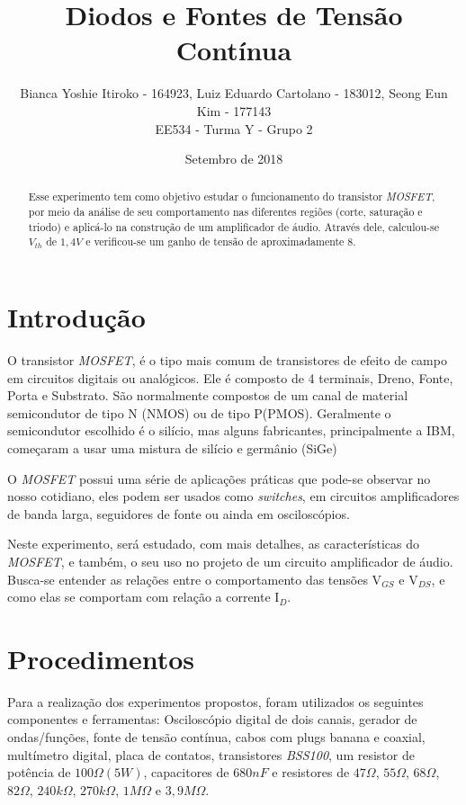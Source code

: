 \documentclass{article}
\begin{document}
\title{Diodos e Fontes de Tensão Contínua}
\author{Bianca Yoshie Itiroko - 164923, Luiz Eduardo Cartolano - 183012, Seong Eun Kim - 177143 \\ EE534 - Turma Y - Grupo 2}
\date{Setembro de 2018}

\maketitle

\begin{abstract}
Esse experimento tem como objetivo estudar o funcionamento do transistor \emph{MOSFET}, por meio da análise de seu comportamento nas diferentes regiões (corte, saturação e triodo) e aplicá-lo na construção de um amplificador de áudio. Através dele, calculou-se $V_{th}$ de $1,4V$ e verificou-se um ganho de tensão de aproximadamente $8$.
\end{abstract}

\section{Introdução}
O transistor \emph{MOSFET}, é o tipo mais comum de transistores de efeito de campo em circuitos digitais ou analógicos. Ele é composto de 4 terminais, Dreno, Fonte, Porta e Substrato. São normalmente compostos de um canal de material semicondutor de tipo N (NMOS) ou de tipo P(PMOS). Geralmente o semicondutor escolhido é o silício, mas alguns fabricantes, principalmente a IBM, começaram a usar uma mistura de silício e germânio (SiGe)

O \emph{MOSFET} possui uma série de aplicações práticas que pode-se observar no nosso cotidiano, eles podem ser usados como \emph{switches}, em circuitos amplificadores de banda larga, seguidores de fonte ou ainda em osciloscópios.

Neste experimento, será estudado, com mais detalhes, as características do \emph{MOSFET}, e também, o seu uso no projeto de um circuito amplificador de áudio. Busca-se entender as relações entre o comportamento das tensões V$_{GS}$ e V$_{DS}$, e como elas se comportam com relação a corrente I$_D$. 

\section{Procedimentos}
Para a realização dos experimentos propostos, foram utilizados os seguintes componentes e ferramentas: Osciloscópio digital de dois canais, gerador de ondas/funções, fonte de tensão contínua, cabos com plugs banana e coaxial, multímetro digital, placa de contatos, transistores \emph{BSS100}, um resistor de potência de $100\Omega (5W)$, capacitores de $680nF$ e resistores de $47\Omega$, $55\Omega$, $68\Omega$, $82\Omega$, $240k\Omega$, $270k\Omega$, $1M\Omega$ e $3,9M\Omega$.
\end{document}

